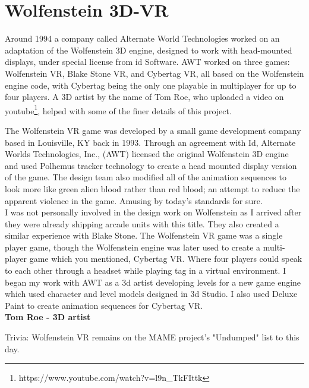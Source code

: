 \section{Wolfenstein 3D-VR}
Around 1994 a company called Alternate World Technologies worked on an adaptation of the Wolfenstein 3D engine, designed to work with head-mounted displays, under special license from id Software. AWT worked on three games: Wolfenstein VR, Blake Stone VR, and Cybertag VR, all based on the Wolfenstein engine code, with Cybertag being the only one playable in multiplayer for up to four players. A 3D artist by the name of Tom Roe, who uploaded a video on youtube\footnote{https://www.youtube.com/watch?v=l9n\_TkFIttk}, helped with some of the finer details of this project.\\

\begin{fancyquotes}
The Wolfenstein VR game was developed by a small game development company based in Louisville, KY back in 1993. Through an agreement with Id, Alternate Worlds Technologies, Inc., (AWT) licensed the original Wolfenstein 3D engine and used Polhemus tracker technology to create a head mounted display version of the game. The design team also modified all of the animation sequences to look more like green alien blood rather than red blood; an attempt to reduce the apparent violence in the game. Amusing by today's standards for sure.
 \bigskip \\
I was not personally involved in the design work on Wolfenstein as I arrived after they were already shipping arcade units with this title. They also created a similar experience with Blake Stone. The Wolfenstein VR game was a single player game, though the Wolfenstein engine was later used to create a multi-player game which you mentioned, Cybertag VR. Where four players could speak to each other through a headset while playing tag in a virtual environment. I began my work with AWT as a 3d artist developing levels for a new game engine which used character and level models designed in 3d Studio. I also used Deluxe Paint to create animation sequences for Cybertag VR.
 \bigskip \\
\textbf{Tom Roe - 3D artist}
 \end{fancyquotes}


Trivia: Wolfenstein VR remains on the MAME project's "Undumped" list to this day.

\begin{figure}[H]
  \centering
 
\end{figure}

\begin{figure}[H]
  \centering
{}
 
\end{figure}

\begin{figure}[H]
  \centering
{}
 
\end{figure}

\begin{figure}[H]
  \centering
{}
 
\end{figure}


